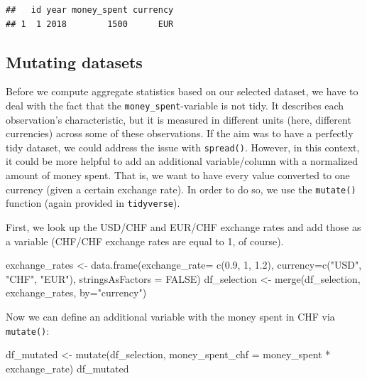 \documentclass[
  12pt,
]{style/krantz}
\newenvironment{Shaded}{\begin{snugshade}}{\end{snugshade}}
\newcommand{\AttributeTok}[1]{\textcolor[rgb]{0.77,0.63,0.00}{#1}}
\newcommand{\ConstantTok}[1]{\textcolor[rgb]{0.00,0.00,0.00}{#1}}
\newcommand{\DecValTok}[1]{\textcolor[rgb]{0.00,0.00,0.81}{#1}}
\newcommand{\FloatTok}[1]{\textcolor[rgb]{0.00,0.00,0.81}{#1}}
\newcommand{\FunctionTok}[1]{\textcolor[rgb]{0.00,0.00,0.00}{#1}}
\newcommand{\NormalTok}[1]{#1}
\newcommand{\OtherTok}[1]{\textcolor[rgb]{0.56,0.35,0.01}{#1}}
\newcommand{\SpecialCharTok}[1]{\textcolor[rgb]{0.00,0.00,0.00}{#1}}
\newcommand{\StringTok}[1]{\textcolor[rgb]{0.31,0.60,0.02}{#1}}
\begin{document}
\begin{verbatim}
##   id year money_spent currency
## 1  1 2018        1500      EUR
\end{verbatim}

\hypertarget{mutating-datasets}{%
\subsection{Mutating datasets}\label{mutating-datasets}}

Before we compute aggregate statistics based on our selected dataset, we have to deal with the fact that the \texttt{money\_spent}-variable is not tidy. It describes each observation's characteristic, but it is measured in different units (here, different currencies) across some of these observations. If the aim was to have a perfectly tidy dataset, we could address the issue with \texttt{spread()}. However, in this context, it could be more helpful to add an additional variable/column with a normalized amount of money spent. That is, we want to have every value converted to one currency (given a certain exchange rate). In order to do so, we use the \texttt{mutate()} function (again provided in \texttt{tidyverse}).

First, we look up the USD/CHF and EUR/CHF exchange rates and add those as a variable (CHF/CHF exchange rates are equal to 1, of course).

\begin{Shaded}
\begin{Highlighting}[]
\NormalTok{exchange\_rates }\OtherTok{\textless{}{-}} \FunctionTok{data.frame}\NormalTok{(}\AttributeTok{exchange\_rate=} \FunctionTok{c}\NormalTok{(}\FloatTok{0.9}\NormalTok{, }\DecValTok{1}\NormalTok{, }\FloatTok{1.2}\NormalTok{),}
                             \AttributeTok{currency=}\FunctionTok{c}\NormalTok{(}\StringTok{"USD"}\NormalTok{, }\StringTok{"CHF"}\NormalTok{, }\StringTok{"EUR"}\NormalTok{), }\AttributeTok{stringsAsFactors =} \ConstantTok{FALSE}\NormalTok{)}
\NormalTok{df\_selection }\OtherTok{\textless{}{-}} \FunctionTok{merge}\NormalTok{(df\_selection, exchange\_rates, }\AttributeTok{by=}\StringTok{"currency"}\NormalTok{)}
\end{Highlighting}
\end{Shaded}

Now we can define an additional variable with the money spent in CHF via \texttt{mutate()}:

\begin{Shaded}
\begin{Highlighting}[]
\NormalTok{df\_mutated }\OtherTok{\textless{}{-}} \FunctionTok{mutate}\NormalTok{(df\_selection, }\AttributeTok{money\_spent\_chf =}\NormalTok{ money\_spent }\SpecialCharTok{*}\NormalTok{ exchange\_rate)}
\NormalTok{df\_mutated}
\end{Highlighting}
\end{Shaded}
\end{document}
